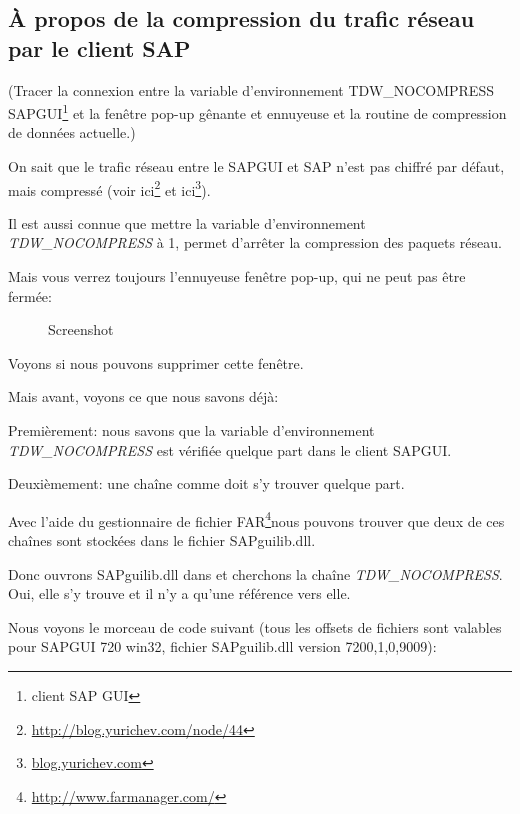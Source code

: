 \subsection{À propos de la compression du trafic réseau par le client SAP}
\label{sec:SAPGUI}


\newcommand{\TDWNC}{TDW\_NOCOMPRESS\xspace}

(Tracer la connexion entre la variable d'environnement \TDWNC{} SAPGUI\footnote{client SAP GUI}
et la fenêtre pop-up gênante et ennuyeuse et la routine de compression de données actuelle.)
 
On sait que le trafic réseau entre le SAPGUI et SAP n'est pas chiffré par défaut,
mais compressé (voir ici\footnote{\url{http://blog.yurichev.com/node/44}} et
ici\footnote{\href{http://blog.yurichev.com/node/47}{blog.yurichev.com}}).

Il est aussi connue que mettre la variable d'environnement \emph{\TDWNC} à 1,
permet d'arrêter la compression des paquets réseau.

Mais vous verrez toujours l'ennuyeuse fenêtre pop-up, qui ne peut pas être fermée:

\begin{figure}[H]
\centering
{}
\caption{Screenshot}
\end{figure}

Voyons si nous pouvons supprimer cette fenêtre.

Mais avant, voyons ce que nous savons déjà:

Premièrement: nous savons que la variable d'environnement \emph{\TDWNC} est vérifiée
quelque part dans le client SAPGUI.

Deuxièmement: une chaîne comme  doit s'y trouver
quelque part.
\newcommand{\FNURLFAR}{\footnote{\url{http://www.farmanager.com/}}}

Avec l'aide du gestionnaire de fichier FAR\FNURLFAR nous pouvons trouver que deux
de ces chaînes sont stockées dans le fichier SAPguilib.dll.

Donc ouvrons SAPguilib.dll dans \IDA et cherchons la chaîne \emph{\TDWNC}.
Oui, elle s'y trouve et il n'y a qu'une référence vers elle.

Nous voyons le morceau de code suivant (tous les offsets de fichiers sont valables
pour SAPGUI 720 win32, fichier SAPguilib.dll version 7200,1,0,9009):

